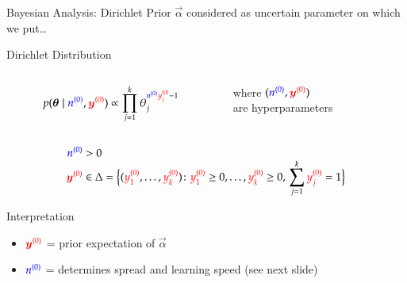 \documentclass{beamer}
\def\rot#1{{\color{red}#1}}
\def\gruen#1{{\color{blue}#1}}
\def\byzr{\rot{\byz}}
\def\yzor{\rot{y\uz_1}}
\def\yzjr{\rot{y\uz_j}}
\def\yzkr{\rot{y\uz_k}}
\def\nzg{\gruen{\nz}}
\begin{document}
\begin{frame}{Bayesian Analysis: Dirichlet Prior}
  $\vec{\alpha}$ considered as uncertain parameter on which we put\dots
  \begin{block}{Dirichlet Distribution}
  \begin{columns}
  \begin{column}{0.65\textwidth}
    \begin{align*}
      p(\vec{\theta}\mid \nzg,\byzr) \propto \prod_{j=1}^k\theta_j^{\nzg\yzjr-1}
    \end{align*}
  \end{column}  
  \begin{column}{0.35\textwidth}
    \rule{0ex}{3ex}where $(\nzg, \byzr)$\\ are hyperparameters
 \end{column}
 \end{columns}\vspace*{-1ex}
    \begin{align*}
      \nzg &> 0\\[-1ex]
      \byzr &\in \Delta=\Big\{
        (\yzor,\dots,\yzkr)\colon \yzor\ge0,\dots,\yzkr\ge 0,\,\sum_{j=1}^k \yzjr=1
      \Big\}
    \end{align*}
  \end{block}
  \begin{block}{Interpretation}
    \begin{itemize}
    \item $\byzr$ = \alert{prior expectation of $\vec{\alpha}$}
    \item $\nzg$ = determines \alert{spread} and \alert{learning speed} (see next slide)
    \end{itemize}
  \end{block}
\end{frame}
\end{document}
